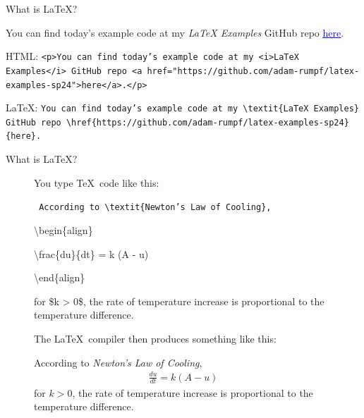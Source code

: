 \documentclass{beamer} %
\begin{document}
\begin{frame}{What is \LaTeX?}

You can find today's example code at my \textit{LaTeX Examples} GitHub repo \href{https://github.com/adam-rumpf/latex-examples-sp24}{\textcolor{blue}{\underline{here}}}.

\vfill

\scriptsize

HTML: \texttt{<p>You can find today's example code at my <i>LaTeX Examples</i> GitHub repo <a~href="https://github.com/adam-rumpf/latex-examples-sp24">here</a>.</p>}

\vfill

\LaTeX: \texttt{You can find today's example code at my \textbackslash textit\{LaTeX Examples\} GitHub repo \textbackslash href\{https://github.com/adam-rumpf/latex-examples-sp24\}\{here\}.}

\end{frame}

\begin{frame}{What is \LaTeX?}

\begin{figure}
	\begin{minipage}{0.45\textwidth}
		You type \TeX\ code like this:
		
		\quad
		
		{\tt \tiny
		According to \textbackslash textit\{Newton's Law of Cooling\},
		
		\quad
		
		\textbackslash begin\{align\}
		
		\qquad \textbackslash frac\{du\}\{dt\} = k (A - u)
		
		\textbackslash end\{align\}
		
		for \$k > 0\$, the rate of temperature increase is proportional to the temperature difference.
		}
	\end{minipage}
	\qquad
	\begin{minipage}{0.45\textwidth}
		The \LaTeX\ compiler then produces something like this:
		
		\quad
		
		{\tiny
		According to \textit{Newton's Law of Cooling},
		\begin{align}
			\frac{du}{dt} = k (A - u)
		\end{align}
		for $k > 0$, the rate of temperature increase is proportional to the temperature difference.
		}
	\end{minipage}
\end{figure}

\end{frame}
\end{document}

